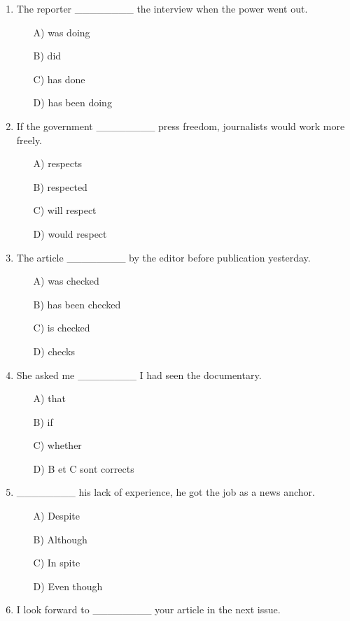 \documentclass[11pt]{article}
\begin{document}
\begin{exercice}
\begin{enumerate}
\item The reporter \_\_\_\_\_\_\_\_ the interview when the power went out.
  \begin{itemize}
  \item[A)] was doing \item[B)] did \item[C)] has done \item[D)] has been doing
  \end{itemize}
\item If the government \_\_\_\_\_\_\_\_ press freedom, journalists would work more freely.
  \begin{itemize}
  \item[A)] respects \item[B)] respected \item[C)] will respect \item[D)] would respect
  \end{itemize}
\item The article \_\_\_\_\_\_\_\_ by the editor before publication yesterday.
  \begin{itemize}
  \item[A)] was checked \item[B)] has been checked \item[C)] is checked \item[D)] checks
  \end{itemize}
\item She asked me \_\_\_\_\_\_\_\_ I had seen the documentary.
  \begin{itemize}
  \item[A)] that \item[B)] if \item[C)] whether \item[D)] B et C sont corrects
  \end{itemize}
\item \_\_\_\_\_\_\_\_ his lack of experience, he got the job as a news anchor.
  \begin{itemize}
  \item[A)] Despite \item[B)] Although \item[C)] In spite \item[D)] Even though
  \end{itemize}
\item I look forward to \_\_\_\_\_\_\_\_ your article in the next issue.

\end{enumerate}
\end{exercice}
\end{document}
